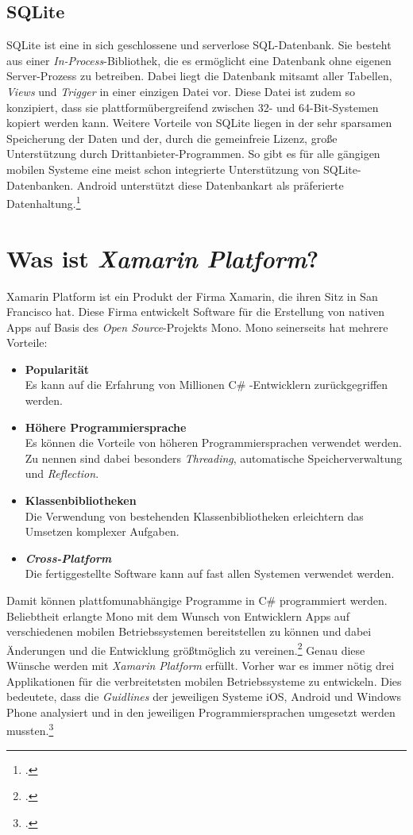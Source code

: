 \subsection{SQLite}
\label{ssec:android-sqlite}
SQLite ist eine in sich geschlossene und serverlose \ac{SQL}-Datenbank. Sie besteht aus einer \textit{In-Process}-Bibliothek, die es ermöglicht eine Datenbank ohne eigenen Server-Prozess zu betreiben. Dabei liegt die Datenbank mitsamt aller Tabellen, \textit{Views} und \textit{\ac{Trigger}} in einer einzigen Datei vor. Diese Datei ist zudem so konzipiert, dass sie plattformübergreifend zwischen 32- und 64-Bit-Systemen kopiert werden kann. Weitere Vorteile von SQLite liegen in der sehr sparsamen Speicherung der Daten und der, durch die gemeinfreie Lizenz, große Unterstützung durch Drittanbieter-Programmen. So gibt es für alle gängigen mobilen Systeme eine meist schon integrierte Unterstützung von SQLite-Datenbanken. Android unterstützt diese Datenbankart als präferierte Datenhaltung.\footcite[S. 226f.]{Android-BeckerPant}
\section{Was ist \textit{Xamarin Platform}?}
\label{sec:defintion-xamarin}
Xamarin Platform ist ein Produkt der Firma Xamarin, die ihren Sitz in San Francisco hat. Diese Firma entwickelt Software für die Erstellung von nativen Apps auf Basis des \textit{Open Source}-Projekts \ac{Mono}. Mono seinerseits hat mehrere Vorteile:
\begin{itemize}
\item \textbf{Popularität}\\Es kann auf die Erfahrung von Millionen C\# -Entwicklern zurückgegriffen werden.
\item \textbf{Höhere Programmiersprache} \\Es können die Vorteile von höheren Programmiersprachen verwendet werden. Zu nennen sind dabei besonders \textit{Threading}, automatische Speicherverwaltung und \textit{\ac{Reflection}}.
\item \textbf{Klassenbibliotheken}\\Die Verwendung von bestehenden Klassenbibliotheken erleichtern das Umsetzen komplexer Aufgaben.
\item \textbf{\textit{Cross-Platform}}\\Die fertiggestellte Software kann auf fast allen Systemen verwendet werden.
\end{itemize}
Damit können plattfomunabhängige Programme in C\# programmiert werden. Beliebtheit erlangte Mono mit dem Wunsch von Entwicklern Apps auf verschiedenen mobilen Betriebssystemen bereitstellen zu können und dabei Änderungen und die Entwicklung größtmöglich zu vereinen.\footcite{Xamarin-Multiplatform} Genau diese Wünsche werden mit \textit{Xamarin Platform} erfüllt. Vorher war es immer nötig drei Applikationen für die verbreitetsten mobilen Betriebssysteme zu entwickeln. Dies bedeutete, dass die \textit{Guidlines} der jeweiligen Systeme iOS, Android und Windows Phone analysiert und in den jeweiligen Programmiersprachen umgesetzt werden mussten.\footcite{Xamarin-Platform}
